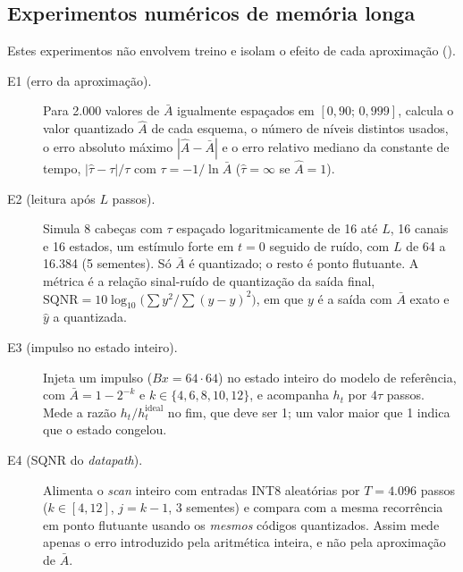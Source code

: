 \documentclass[12pt]{article}
\begin{document}
\subsection{Experimentos numéricos de memória longa}
Estes experimentos não envolvem treino e isolam o efeito de cada aproximação ().
\begin{description}
  \item[E1 (erro da aproximação).] Para 2.000 valores de $\bar{A}$ igualmente espaçados em $[0{,}90;\,0{,}999]$, calcula o valor quantizado $\hat{A}$ de cada esquema, o número de níveis distintos usados, o erro absoluto máximo $|\hat{A} - \bar{A}|$ e o erro relativo mediano da constante de tempo, $|\hat\tau - \tau|/\tau$ com $\tau = -1/\ln \bar{A}$ ($\hat\tau = \infty$ se $\hat{A} = 1$).
  \item[E2 (leitura após $L$ passos).] Simula 8 cabeças com $\tau$ espaçado logaritmicamente de 16 até $L$, 16 canais e 16 estados, um estímulo forte em $t=0$ seguido de ruído, com $L$ de 64 a 16.384 (5 sementes). Só $\bar{A}$ é quantizado; o resto é ponto flutuante. A métrica é a relação sinal-ruído de quantização da saída final, $\mathrm{SQNR} = 10\log_{10}\big(\sum y^2 / \sum (\hat{y}-y)^2\big)$, em que $y$ é a saída com $\bar{A}$ exato e $\hat{y}$ a quantizada.
  \item[E3 (impulso no estado inteiro).] Injeta um impulso ($B x = 64 \cdot 64$) no estado inteiro do modelo de referência, com $\bar{A} = 1 - 2^{-k}$ e $k \in \{4, 6, 8, 10, 12\}$, e acompanha $h_t$ por $4\tau$ passos. Mede a razão $h_t/h_t^{\mathrm{ideal}}$ no fim, que deve ser 1; um valor maior que 1 indica que o estado congelou.
  \item[E4 (SQNR do \emph{datapath}).] Alimenta o \emph{scan} inteiro com entradas INT8 aleatórias por $T=4.096$ passos ($k \in [4,12]$, $j = k-1$, 3 sementes) e compara com a mesma recorrência em ponto flutuante usando os \emph{mesmos} códigos quantizados. Assim mede apenas o erro introduzido pela aritmética inteira, e não pela aproximação de $\bar{A}$.
\end{description}
\end{document}
